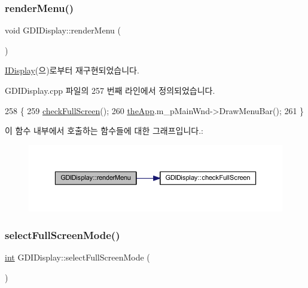 \mbox{\label{class_g_d_i_display_a0d38608d640f217ded743d3c88dfe62a}} 
\subsubsection{\texorpdfstring{render\+Menu()}{renderMenu()}}
{\footnotesize\ttfamily void G\+D\+I\+Display\+::render\+Menu (\begin{DoxyParamCaption}{ }\end{DoxyParamCaption})\hspace{0.3cm}{\ttfamily [virtual]}}



\mbox{\hyperlink{class_i_display_ad6fc199a615635440ca01485c1283d41}{I\+Display}}(으)로부터 재구현되었습니다.



G\+D\+I\+Display.\+cpp 파일의 257 번째 라인에서 정의되었습니다.


\begin{DoxyCode}
258 \{
259   \mbox{\hyperlink{class_g_d_i_display_a515bce84bcfc615fe0bb983f2ce3e20b}{checkFullScreen}}();
260   \mbox{\hyperlink{_v_b_a_8cpp_a8095a9d06b37a7efe3723f3218ad8fb3}{theApp}}.m\_pMainWnd->DrawMenuBar();
261 \}
\end{DoxyCode}
이 함수 내부에서 호출하는 함수들에 대한 그래프입니다.\+:
\nopagebreak
\begin{figure}[H]
\begin{center}
\leavevmode
\includegraphics[width=350pt]{class_g_d_i_display_a0d38608d640f217ded743d3c88dfe62a_cgraph}
\end{center}
\end{figure}
\mbox{\label{class_g_d_i_display_ace69c8ae01b3842aebfabb4f008c529d}} 
\subsubsection{\texorpdfstring{select\+Full\+Screen\+Mode()}{selectFullScreenMode()}}
{\footnotesize\ttfamily \mbox{\hyperlink{_util_8cpp_a0ef32aa8672df19503a49fab2d0c8071}{int}} G\+D\+I\+Display\+::select\+Full\+Screen\+Mode (\begin{DoxyParamCaption}\item[{G\+U\+ID $\ast$$\ast$}]{ }\end{DoxyParamCaption})\hspace{0.3cm}{\ttfamily [virtual]}}



